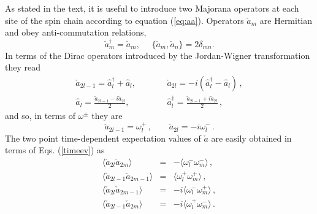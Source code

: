 \documentclass[12pt,preprint,tighten,eqsecnum,aps,floats,psfig,epsfig,amsmath,onecolumn]{revtex4-1}
\def\be{\begin{equation}}
\def\ee{\end{equation}}
\def\bea{\begin{eqnarray}}
\def\eea{\end{eqnarray}}
\def\o{\omega}
\def\Fa{\hat{a}}
\def\Ma{\check{a}}
\begin{document}
As stated in the text, it is useful to introduce two Majorana 
operators \cite{Vidal} at each site of the spin chain 
according to equation (\ref{eq:aa}).
Operators $\Ma_m$ are Hermitian and obey anti-commutation relations, 
\be
\Ma_m^{\dagger} = \Ma_m,~~~~~~\{\Ma_m, \Ma_n\}= 2\delta_{mn}.
\ee
In terms of the Dirac operators introduced by the Jordan-Wigner 
transformation they read
\bea
\Ma_{2l-1}=\Fa^\dag_l+\Fa_l,&\qquad& \Ma_{2l}=-i(\Fa^\dag_l-\Fa_l)
\,,\nonumber\\
\Fa_l=\frac{\Ma_{2l-1}-i\Ma_{2l}}{2},&\qquad&
\Fa_l^\dag=\frac{\Ma_{2l-1}+i\Ma_{2l}}{2}\,,
\eea
and so, in terms of $\o^\pm$ they are
\be
\Ma_{2l-1}=\o^+_l\,,\qquad \Ma_{2l}=-i\o^-_l\,.
\ee
The two point time-dependent expectation values of $\Ma$ are easily 
obtained in terms of Eqs. (\ref{timeev}) as
\bea
\langle \Ma_{2l} \Ma_{2m}\rangle&=&-\langle\o^-_l\o^-_m\rangle\,,\nonumber\\
\langle \Ma_{2l-1} \Ma_{2m-1}\rangle&=&\langle\o^+_l\o^+_m\rangle\,,\nonumber\\
\langle \Ma_{2l} \Ma_{2m-1}\rangle&=&-i\langle\o^-_l\o^+_m\rangle\,,\nonumber\\
\langle \Ma_{2l-1} \Ma_{2m}\rangle&=&-i\langle\o^+_l\o^-_m\rangle\,.
\label{majoex}
\eea
\end{document}
